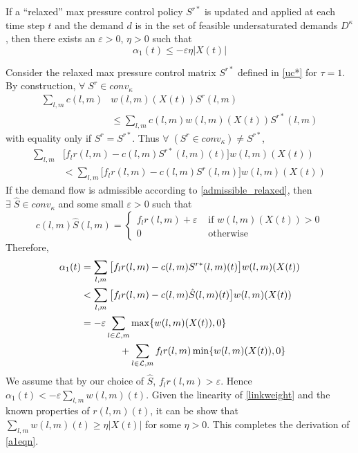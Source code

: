  \begin{Lem} \label{alpha1bound}
If a ``relaxed'' max pressure control policy $S^{r*}$ is updated and applied at each time step $t$ and the demand $d$ is in the set of feasible undersaturated demands $D^\kappa$, then there exists an $\varepsilon>0$, $\eta>0$ such that 
\begin{equation} \label{a1eqn} 
\alpha_1(t)  \leq -\varepsilon \eta \big| X(t)\big| 
\end{equation}
\end{Lem}
\begin{IEEEproof}
Consider the relaxed max pressure control matrix $S^{r*}$ defined in \eqref{uc*} for $\tau =1$. By construction, $ \forall \; S^r \in conv_{\kappa}$
\begin{align} \nonumber
\sum_{l,m}c(l,m)& w(l,m)(X(t))S^r (l,m) \\
&\leq \sum_{l,m}c(l,m)w(l,m)(X(t))S^{r*}(l,m) 
\end{align}
with equality only if $S^r = S^{r*}$. 
Thus $\forall \; (S^r  \in conv_{\kappa}) \neq S^{r*}$,
\begin{align} \nonumber
 \sum_{l,m}&\big[f_{l}r(l,m) - c(l,m)S^{r*}(l,m)(t)\big]w(l,m)(X(t)) \\
&<   \sum_{l,m}\big[f_{l}r(l,m) - c(l,m)S^r(l,m)\big]w(l,m)(X(t))
\end{align}
If the demand flow is admissible according to \eqref{admissible_relaxed}, then 
$\exists \; \hat{S} \in conv_{\kappa}$ and some small $\varepsilon>0$ such that 
\begin{equation} \nonumber
c(l,m)\hat{S} (l,m) = \begin{cases}
        f_{l}r(l,m) + \varepsilon & \text{ if } w(l,m)(X(t)) > 0 \\
        0 & \text{ otherwise}
    \end{cases}
\end{equation}
Therefore, 
\begin{align} \nonumber
 \alpha_1(t) &= \sum_{l,m}\big[f_{l}r(l,m) -  c(l,m)S^{r*}(l,m)(t)\big] w(l,m)(X(t))  \\ \nonumber
 &< \sum_{l,m}\big[f_{l}r(l,m) -  c(l,m)\hat{S}(l,m)(t)\big] w(l,m)(X(t)) \\ 
&  = -\varepsilon \sum_{l \in \mathcal{L},m} \max\{w(l,m)(X(t)) ,0\} \\ \nonumber
&\qquad \qquad +  \sum_{l \in \mathcal{L},m}  f_l r(l,m)  \min\{ w(l,m)(X(t)) ,0\}
\end{align}
We assume that by our choice of $\hat{S}$, $f_{l}r(l,m) > \varepsilon$. Hence
$\alpha_1(t) < -\varepsilon \sum_{l,m}w(l,m)(t)$. 
Given the linearity of \eqref{linkweight} and the known properties of $r(l,m)(t)$, it can be show that $\sum_{l,m}w(l,m)(t) \geq \eta |X(t)|$ for some $\eta >0$. This completes the derivation of \eqref{a1eqn}.
\end{IEEEproof}
